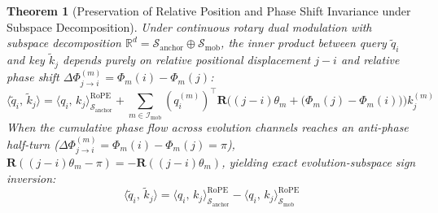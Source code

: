 \documentclass[11pt,a4paper]{article}
\newtheorem{theorem}{Theorem}
\theoremstyle{definition}
\begin{document}
\begin{theorem}[Preservation of Relative Position and Phase Shift Invariance under Subspace Decomposition]
\label{thm:trans_inv}
Under continuous rotary dual modulation with subspace decomposition $\mathbb{R}^d = \mathcal{S}_{\text{anchor}} \oplus \mathcal{S}_{\text{mob}}$, the inner product between query $\tilde{q}_i$ and key $\tilde{k}_j$ depends purely on relative positional displacement $j - i$ and relative phase shift $\Delta \Phi_{j \to i}^{(m)} = \Phi_m(i) - \Phi_m(j)$:
\begin{equation}
\langle \tilde{q}_i, \, \tilde{k}_j \rangle = \langle q_i, \, k_j \rangle_{\mathcal{S}_{\text{anchor}}}^{\mathrm{RoPE}} + \sum_{m \in \mathcal{I}_{\text{mob}}} (q_i^{(m)})^\top \mathbf{R}\Big( (j - i)\theta_m + \big(\Phi_m(j) - \Phi_m(i)\big) \Big) k_j^{(m)}
\end{equation}
When the cumulative phase flow across evolution channels reaches an anti-phase half-turn ($\Delta \Phi_{j \to i}^{(m)} = \Phi_m(i) - \Phi_m(j) = \pi$), $\mathbf{R}((j - i)\theta_m - \pi) = -\mathbf{R}((j - i)\theta_m)$, yielding exact evolution-subspace sign inversion:
\begin{equation}
\langle \tilde{q}_i, \, \tilde{k}_j \rangle = \langle q_i, \, k_j \rangle_{\mathcal{S}_{\text{anchor}}}^{\mathrm{RoPE}} - \langle q_i, \, k_j \rangle_{\mathcal{S}_{\text{mob}}}^{\mathrm{RoPE}}
\end{equation}
\end{theorem}
\end{document}
